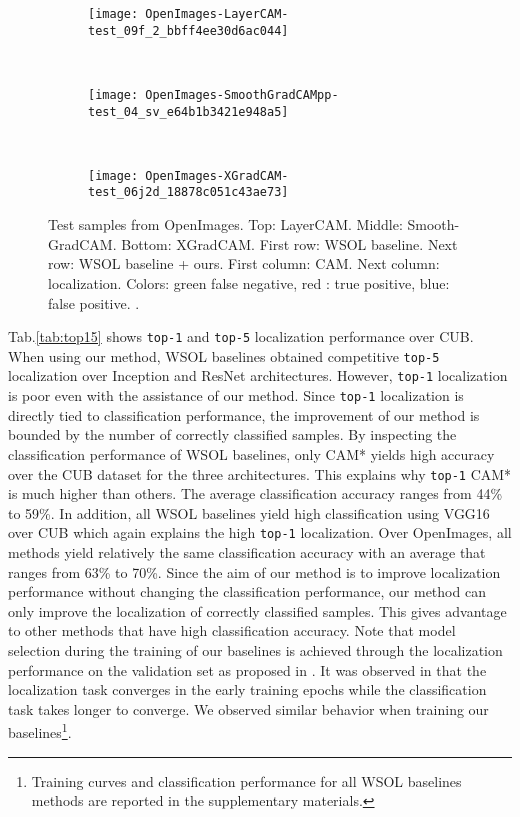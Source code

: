 \documentclass[twocolumn]{article}
\newcommand\topone{\texttt{top-1}\xspace}
\newcommand\topfive{\texttt{top-5}\xspace}
\theoremstyle{definition}
\begin{document}
\begin{figure}
     \centering
     \begin{subfigure}[b]{0.45\textwidth}
         \centering
         \texttt{[image: OpenImages-LayerCAM-test\_09f\_2\_bbff4ee30d6ac044]}
     \end{subfigure}
     \\
     \vspace{.2cm}
     \begin{subfigure}[b]{0.45\textwidth}
         \centering
         \texttt{[image: OpenImages-SmoothGradCAMpp-test\_04\_sv\_e64b1b3421e948a5]}
     \end{subfigure}
     \\
     \vspace{.2cm}
     \begin{subfigure}[b]{0.45\textwidth}
         \centering
         \texttt{[image: OpenImages-XGradCAM-test\_06j2d\_18878c051c43ae73]}
     \end{subfigure}
        \caption{Test samples from OpenImages. Top: LayerCAM. Middle: Smooth-GradCAM. Bottom: XGradCAM. First row: WSOL baseline. Next row: WSOL baseline + ours. First column: CAM. Next column: localization. Colors: green false negative, red : true positive, blue: false positive. .}
        \label{fig:mainvisuopenimages}
\end{figure}


Tab.\ref{tab:top15} shows \topone and \topfive localization performance over CUB. When using our method, WSOL baselines obtained competitive \topfive localization over Inception and ResNet architectures. However, \topone localization is poor even with the assistance of our method. Since \topone localization is directly tied to classification performance, the improvement of our method is bounded by the number of correctly classified samples. By inspecting the classification performance of WSOL baselines, only CAM* yields high accuracy over the CUB dataset for the three architectures. This explains why \topone CAM* is much higher than others. The average classification accuracy ranges from 44\% to 59\%. In addition, all WSOL baselines yield high classification using VGG16 over CUB which again explains the high \topone localization. Over OpenImages, all methods yield relatively the same classification accuracy with an average that ranges from 63\% to 70\%.
Since the aim of our method is to improve localization performance without changing the classification performance, our method can only improve the localization of correctly classified samples. This gives advantage to other methods that have high classification accuracy. Note that model selection during the training of our baselines is achieved through the localization performance on the validation set as proposed in \cite{choe2020evaluating}. It was observed in \cite{choe2020evaluating} that the localization task converges in the early training epochs while the classification task takes longer to converge. We observed similar behavior when training our baselines\footnote{Training curves and classification performance for all WSOL baselines methods are reported in the supplementary materials.}.
\end{document}
